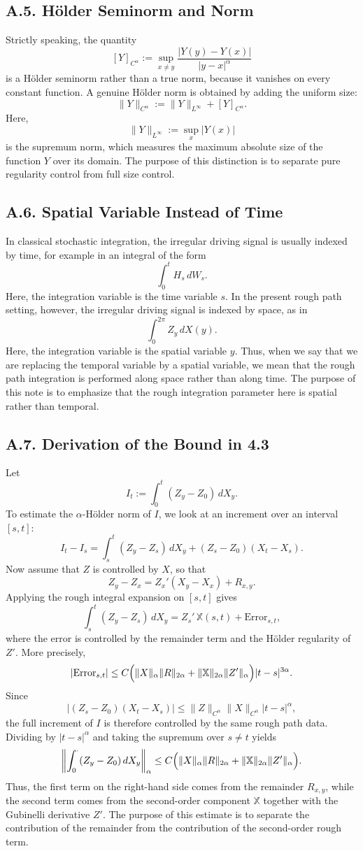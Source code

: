 \documentclass[11pt]{article}
\theoremstyle{definition}
\theoremstyle{remark}
\begin{document}
\subsection*{A.5. H\"older Seminorm and Norm}
Strictly speaking, the quantity
\[
[Y]_{C^\alpha}
:=
\sup_{x\neq y}\frac{|Y(y)-Y(x)|}{|y-x|^\alpha}
\]
is a H\"older seminorm rather than a true norm, because it vanishes on every constant function. A genuine H\"older norm is obtained by adding the uniform size:
\[
\|Y\|_{C^\alpha}
:=
\|Y\|_{L^\infty}
+
[Y]_{C^\alpha}.
\]
Here,
\[
\|Y\|_{L^\infty}
:=
\sup_x |Y(x)|
\]
is the supremum norm, which measures the maximum absolute size of the function $Y$ over its domain.
The purpose of this distinction is to separate pure regularity control from full size control.

\subsection*{A.6. Spatial Variable Instead of Time}
In classical stochastic integration, the irregular driving signal is usually indexed by time, for example in an integral of the form
\[
\int_0^t H_s\,dW_s.
\]
Here, the integration variable is the time variable $s$. In the present rough path setting, however, the irregular driving signal is indexed by space, as in
\[
\int_0^{2\pi} Z_y\,dX(y).
\]
Here, the integration variable is the spatial variable $y$. Thus, when we say that we are replacing the temporal variable by a spatial variable, we mean that the rough path integration is performed along space rather than along time.
The purpose of this note is to emphasize that the rough integration parameter here is spatial rather than temporal.

\subsection*{A.7. Derivation of the Bound in 4.3}
Let
\[
I_t:=\int_0^t (Z_y-Z_0)\,dX_y.
\]
To estimate the $\alpha$-H\"older norm of $I$, we look at an increment over an interval $[s,t]$:
\[
I_t-I_s
=
\int_s^t (Z_y-Z_s)\,dX_y
+
(Z_s-Z_0)(X_t-X_s).
\]
Now assume that $Z$ is controlled by $X$, so that
\[
Z_y-Z_x
=
Z_x'(X_y-X_x)+R_{x,y}.
\]
Applying the rough integral expansion on $[s,t]$ gives
\[
\int_s^t (Z_y-Z_s)\,dX_y
=
Z_s'\,\mathbb X(s,t)+\mathrm{Error}_{s,t},
\]
where the error is controlled by the remainder term and the H\"older regularity of $Z'$. More precisely,
\[
|\mathrm{Error}_{s,t}|
\le
C\Bigl(\|X\|_{\alpha}\|R\|_{2\alpha}
+
\|\mathbb X\|_{2\alpha}\|Z'\|_{\alpha}\Bigr)|t-s|^{3\alpha}.
\]
Since
\[
|(Z_s-Z_0)(X_t-X_s)|
\le
\|Z\|_{C^\alpha}\|X\|_{C^\alpha}|t-s|^\alpha,
\]
the full increment of $I$ is therefore controlled by the same rough path data. Dividing by $|t-s|^\alpha$ and taking the supremum over $s\neq t$ yields
\[
\left\|\int_0^\cdot (Z_y-Z_0)\,dX_y\right\|_{\alpha}
\le
C\Bigl(\|X\|_{\alpha}\|R\|_{2\alpha}
+
\|\mathbb X\|_{2\alpha}\|Z'\|_{\alpha}\Bigr).
\]
Thus, the first term on the right-hand side comes from the remainder $R_{x,y}$, while the second term comes from the second-order component $\mathbb X$ together with the Gubinelli derivative $Z'$.
The purpose of this estimate is to separate the contribution of the remainder from the contribution of the second-order rough term.
\end{document}
